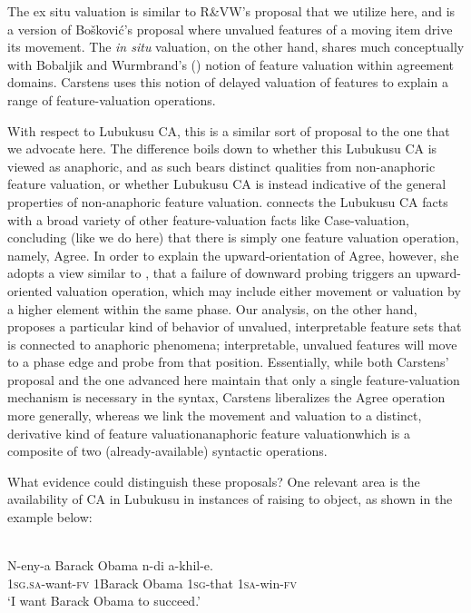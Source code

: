 The ex situ valuation is similar to R\&VW’s proposal that we utilize here, and is a version of Bošković’s \citep{Boskovic:2007b, Boskovic:2011} proposal where unvalued features of a moving item drive its movement. The \textit{in situ} valuation, on the other hand, shares much conceptually with Bobaljik and Wurmbrand’s (\citeyear{BobaljikWurmbrand:2005}) notion of feature valuation within agreement domains.  Carstens uses this notion of delayed valuation of features to explain a range of feature-valuation operations.  

With respect to Lubukusu CA, this is a similar sort of proposal to the one that we advocate here. The difference boils down to whether this Lubukusu CA is viewed as anaphoric, and as such bears distinct qualities from non-anaphoric feature valuation, or whether Lubukusu CA is instead indicative of the general properties of non-anaphoric feature valuation. \citet{Carstens:2016} connects the Lubukusu CA facts with a broad variety of other feature-valuation facts like Case-valuation, concluding (like we do here) that there is simply one feature valuation operation, namely, Agree.  In order to explain the upward-orientation of Agree, however, she adopts a view similar to \citet{Bejar:2009}, that a failure of downward probing triggers an upward-oriented valuation operation, which may include either movement or valuation by a higher element within the same phase. Our analysis, on the other hand, proposes a particular kind of behavior of unvalued, interpretable feature sets that is connected to anaphoric phenomena; interpretable, unvalued features will move to a phase edge and probe from that position. Essentially, while both Carstens’ proposal and the one advanced here maintain that only a single feature-valuation mechanism is necessary in the syntax, Carstens liberalizes the Agree operation more generally, whereas we link the movement and valuation to a distinct, derivative kind of feature valuation\textemdash anaphoric feature valuation\textemdash which is a composite of two (already-available) syntactic operations.

What evidence could distinguish these proposals? One relevant area is the availability of CA in Lubukusu in instances of raising to object, as shown in the example below: 

\ea	\label{RtOwithCA}
 \\
\gll N-eny-a Barack Obama n-di a-khil-e.\\
1\textsc{sg}.\textsc{sa}-want-\textsc{fv} 1Barack Obama 1\textsc{sg}-that 1\textsc{sa}-win-\textsc{fv}\\
\glt `I want Barack Obama to succeed.'
\z

